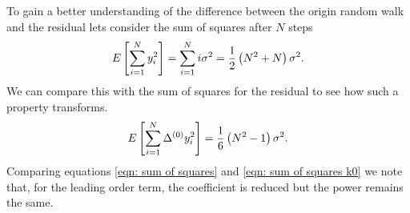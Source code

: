 To gain a better understanding of the difference between the origin random walk
and the residual lets consider the sum of squares after $N$ steps
\begin{equation}
E\left[\sum_{i=1}^{N} y_{i}^{2}\right] = \sum_{i=1}^{N} i \sigma^{2} =
                               \frac{1}{2}\left(N^{2} + N\right)\sigma^{2}.
\label{eqn: sum of squares}
\end{equation}
We can compare this with the sum of squares for the residual to see how such a
property transforms.
\begin{equation}
E\left[\sum_{i=1}^{N} \Delta^{(0)} y_{i}^{2}\right] = \frac{1}{6}\left(N^{2} -1\right)\sigma^{2}.
\label{eqn: sum of squares k0}
\end{equation}
Comparing equations \eqref{eqn: sum of squares} and \eqref{eqn: sum of squares k0}
we note that, for the leading
order term, the coefficient is reduced but the power remains the same.

%

